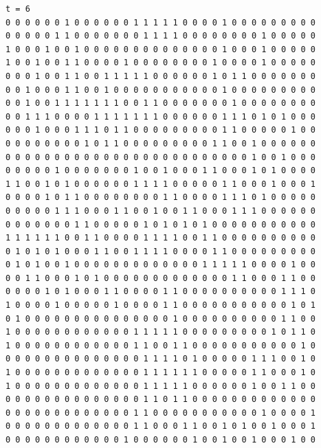 \documentclass[a4paper,12pt]{article}
\begin{document}
\begin{verbatim}
t = 6
0 0 0 0 0 0 1 0 0 0 0 0 0 1 1 1 1 1 0 0 0 0 1 0 0 0 0 0 0 0 0 0 
0 0 0 0 0 1 1 0 0 0 0 0 0 0 1 1 1 1 0 0 0 0 0 0 0 0 1 0 0 0 0 0 
1 0 0 0 1 0 0 1 0 0 0 0 0 0 0 0 0 0 0 0 0 0 1 0 0 0 1 0 0 0 0 0 
1 0 0 1 0 0 1 1 0 0 0 0 1 0 0 0 0 0 0 0 0 1 0 0 0 0 1 0 0 0 0 0 
0 0 0 1 0 0 1 1 0 0 1 1 1 1 1 0 0 0 0 0 0 1 0 1 1 0 0 0 0 0 0 0 
0 0 1 0 0 0 1 1 0 0 1 0 0 0 0 0 0 0 0 0 0 0 1 0 0 0 0 0 0 0 0 0 
0 0 1 0 0 1 1 1 1 1 1 1 0 0 1 1 0 0 0 0 0 0 0 1 0 0 0 0 0 0 0 0 
0 0 1 1 1 0 0 0 0 1 1 1 1 1 1 1 0 0 0 0 0 0 1 1 1 0 1 0 1 0 0 0 
0 0 0 1 0 0 0 1 1 1 0 1 1 0 0 0 0 0 0 0 0 0 1 1 0 0 0 0 0 1 0 0 
0 0 0 0 0 0 0 0 1 0 1 1 0 0 0 0 0 0 0 0 0 1 1 0 0 1 0 0 0 0 0 0 
0 0 0 0 0 0 0 0 0 0 0 0 0 0 0 0 0 0 0 0 0 0 0 0 0 1 0 0 1 0 0 0 
0 0 0 0 0 1 0 0 0 0 0 0 0 1 0 0 1 0 0 0 1 1 0 0 0 1 0 1 0 0 0 0 
1 1 0 0 1 0 1 0 0 0 0 0 0 1 1 1 1 0 0 0 0 0 1 1 0 0 0 1 0 0 0 1 
0 0 0 0 1 0 1 1 0 0 0 0 0 0 0 0 1 1 0 0 0 0 1 1 1 0 1 0 0 0 0 0 
0 0 0 0 0 1 1 1 0 0 0 1 1 0 0 1 0 0 1 1 0 0 0 1 1 1 0 0 0 0 0 0 
0 0 0 0 0 0 0 1 1 0 0 0 0 0 1 0 1 0 1 0 1 0 0 0 0 0 0 0 0 0 0 0 
1 1 1 1 1 1 0 0 1 1 0 0 0 0 1 1 1 1 0 0 1 1 0 0 0 0 0 0 0 0 0 0 
0 1 0 1 0 1 0 0 0 1 1 0 0 1 1 1 1 0 0 0 0 1 1 0 0 0 0 0 0 0 0 0 
0 1 0 1 0 0 1 0 0 0 0 0 0 0 0 0 0 0 0 0 1 1 1 1 1 0 0 0 0 1 0 0 
0 0 1 1 0 0 0 1 0 1 0 0 0 0 0 0 0 0 0 0 0 0 0 1 1 0 0 0 1 1 0 0 
0 0 0 0 1 0 1 0 0 0 1 1 0 0 0 0 1 1 0 0 0 0 0 0 0 0 0 0 1 1 1 0 
1 0 0 0 0 1 0 0 0 0 0 1 0 0 0 0 1 1 0 0 0 0 0 0 0 0 0 0 0 1 0 1 
0 1 0 0 0 0 0 0 0 0 0 0 0 0 0 0 0 1 0 0 0 0 0 0 0 0 0 0 1 1 0 0 
1 0 0 0 0 0 0 0 0 0 0 0 0 1 1 1 1 1 0 0 0 0 0 0 0 0 0 1 0 1 1 0 
1 0 0 0 0 0 0 0 0 0 0 0 0 1 1 0 0 1 1 0 0 0 0 0 0 0 0 0 0 0 1 0 
0 0 0 0 0 0 0 0 0 0 0 0 0 0 1 1 1 1 0 1 0 0 0 0 0 1 1 1 0 0 1 0 
1 0 0 0 0 0 0 0 0 0 0 0 0 0 1 1 1 1 1 1 0 0 0 0 0 1 1 0 0 0 1 0 
1 0 0 0 0 0 0 0 0 0 0 0 0 0 1 1 1 1 1 0 0 0 0 0 0 1 0 0 1 1 0 0 
0 0 0 0 0 0 0 0 0 0 0 0 0 0 1 1 0 1 1 0 0 0 0 0 0 0 0 0 0 0 0 0 
0 0 0 0 0 0 0 0 0 0 0 0 0 1 1 0 0 0 0 0 0 0 0 0 0 0 1 0 0 0 0 1 
0 0 0 0 0 0 0 0 0 0 0 0 0 1 1 0 0 0 1 1 0 0 1 0 1 0 0 1 0 0 0 1 
0 0 0 0 0 0 0 0 0 0 0 0 1 0 0 0 0 0 0 1 0 0 1 0 0 1 0 0 0 1 0 0 




\end{verbatim}
\end{document}
